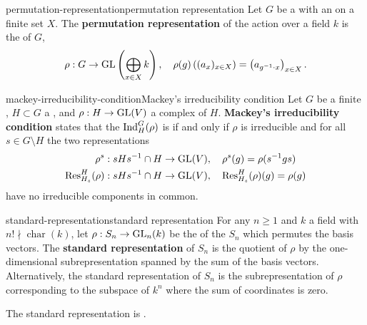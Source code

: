 \begin{topic}{permutation-representation}{permutation representation}
    Let $G$ be a  with an  on a finite set $X$. The \textbf{permutation representation} of the action over a field $k$ is the  of $G$,
    \[ \rho : G \to \textup{GL}\left( \bigoplus_{x \in X} k \right), \quad \rho(g)\left( (a_x)_{x \in X} \right) = \left( a_{g^{-1} \cdot x} \right)_{x \in X} . \]
\end{topic}

\begin{topic}{mackey-irreducibility-condition}{Mackey's irreducibility condition}
    Let $G$ be a finite , $H \subset G$ a , and $\rho : H \to \textup{GL}(V)$ a complex  of $H$. \textbf{Mackey's irreducibility condition} states that the  $\textup{Ind}_H^G(\rho)$ is  if and only if $\rho$ is irreducible and for all $s \in G \setminus H$ the two representations
    \[ \begin{aligned}
        \rho^s &: s H s^{-1} \cap H \to \textup{GL}(V), \quad \rho^s(g) = \rho(s^{-1} g s) \\
        \textup{Res}_{H_s}^{H}(\rho) &: s H s^{-1} \cap H \to \textup{GL}(V) , \quad \textup{Res}_{H_s}^{H}(\rho)(g) = \rho(g)
    \end{aligned} \]
    have no irreducible components in common.
\end{topic}


\begin{topic}{standard-representation}{standard representation}
    For any $n \ge 1$ and $k$ a field with $n! \nmid \operatorname{char}(k)$, let $\rho : S_n \to \textup{GL}_n(k)$ be the  of the  $S_n$ which permutes the basis vectors. The \textbf{standard representation} of $S_n$ is the quotient of $\rho$ by the one-dimensional subrepresentation spanned by the sum of the basis vectors. Alternatively, the standard representation of $S_n$ is the subrepresentation of $\rho$ corresponding to the subspace of $k^n$ where the sum of coordinates is zero.
    
    The standard representation is .
\end{topic}


